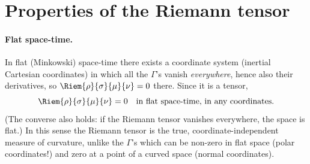 \section{Properties of the Riemann tensor}

\paragraph{Flat space-time.} In flat (Minkowski) space-time there exists a coordinate system (inertial Cartesian coordinates) in which all the $\Gamma$'s vanish \emph{everywhere}, hence also their derivatives, so $\Riem{\rho}{\sigma}{\mu}{\nu}=0$ there. Since it is a tensor,
\begin{equation}
  \Riem{\rho}{\sigma}{\mu}{\nu}=0\quad\text{in flat space-time, in any coordinates.}
\end{equation}
(The converse also holds: if the Riemann tensor vanishes everywhere, the space is flat.) In this sense the Riemann tensor is the true, coordinate-independent measure of curvature, unlike the $\Gamma$'s which can be non-zero in flat space (polar coordinates!) and zero at a point of a curved space (normal coordinates).

